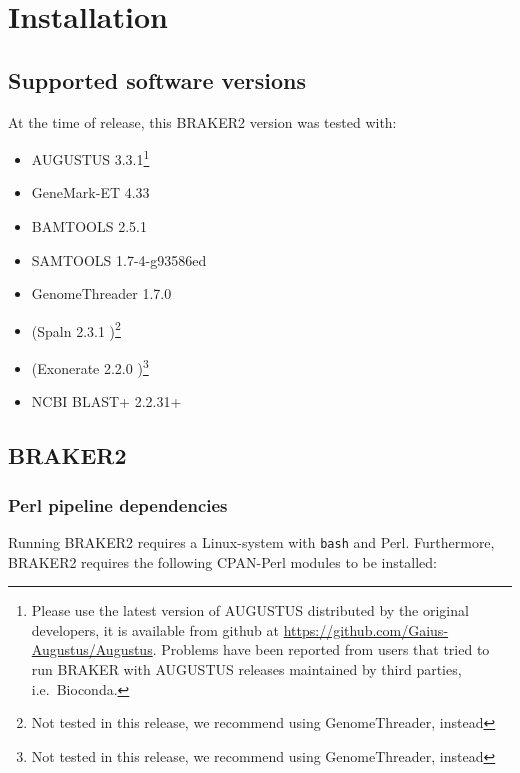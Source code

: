 \documentclass[]{article}
\begin{document}
\section{Installation}\label{installation}

\subsection{Supported software versions}\label{supported-software-versions}

At the time of release, this BRAKER2 version was tested with:

\begin{itemize}
\item
  AUGUSTUS 3.3.1\footnote{Please use the latest version of AUGUSTUS
    distributed by the original developers, it is available from github
    at \url{https://github.com/Gaius-Augustus/Augustus}. Problems have
    been reported from users that tried to run BRAKER with AUGUSTUS
    releases maintained by third parties, i.e.~Bioconda.}
\item
  GeneMark-ET 4.33
\item
  BAMTOOLS 2.5.1 \cite{barnett2011bamtools}
\item
  SAMTOOLS 1.7-4-g93586ed \cite{li2009sequence}
\item
  GenomeThreader 1.7.0 \cite{gremme2013}
\item
  (Spaln 2.3.1 \cite{gotoh2008direct,gotoh2008space,iwata2012benchmarking})\footnote{Not tested in this release, we
    recommend using GenomeThreader, instead}
\item
  (Exonerate 2.2.0 \cite{slater2005automated})\footnote{Not tested in
    this release, we recommend using GenomeThreader, instead}
\item
  NCBI BLAST+ 2.2.31+  \cite{Altschul:1990,camacho2009blast+}
\end{itemize}

\subsection{BRAKER2}\label{braker2}

\subsubsection{Perl pipeline dependencies}\label{perl-pipeline-dependencies}

Running BRAKER2 requires a Linux-system with \texttt{bash} and Perl.
Furthermore, BRAKER2 requires the following CPAN-Perl modules to be
installed:
\end{document}
